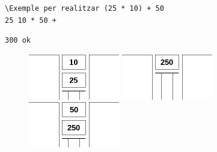 \documentclass{article}
\begin{document}
\begin{lstlisting}[frame=single]
\Exemple per realitzar (25 * 10) + 50
25 10 * 50 +
\end{lstlisting}
\begin{lstlisting}[frame=single,language=TeX]
300 ok
\end{lstlisting}

\begin{figure}[h!]
	\begin{minipage}[b]{0.2\linewidth}
		\includegraphics[width=\linewidth]{stack_1}
		\caption{}
		\label{fig:stack_1}
	\end{minipage}
	\hfill
	\begin{minipage}[b]{0.2\linewidth}
		\includegraphics[width=\linewidth]{stack_2}
		\caption{}
		\label{fig:stack_2}
	\end{minipage}
	\hfill
	\begin{minipage}[b]{0.2\linewidth}
		\includegraphics[width=\linewidth]{stack_3}

\end{minipage}
\end{figure}
\end{document}
